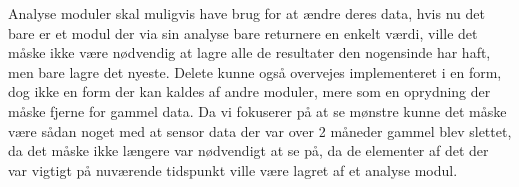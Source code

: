 Analyse moduler skal muligvis have brug for at ændre deres data, hvis nu det bare er et modul der via sin analyse bare returnere en enkelt værdi, ville det måske ikke være nødvendig at lagre alle de resultater den nogensinde har haft, men bare lagre det nyeste.
Delete kunne også overvejes implementeret i en form, dog ikke en form der kan kaldes af andre moduler, mere som en oprydning der måske fjerne for gammel data. Da vi fokuserer på at se mønstre kunne det måske være sådan noget med at sensor data der var over 2 måneder gammel blev slettet, da det måske ikke længere var nødvendigt at se på, da de elementer af det der var vigtigt på nuværende tidspunkt ville være lagret af et analyse modul.